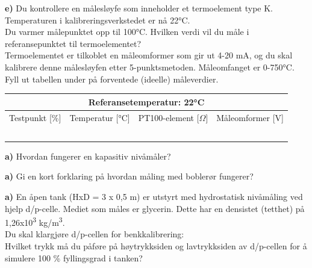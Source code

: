 \textbf{e)}
Du kontrollere en målesløyfe som inneholder et termoelement type K. Temperaturen i
kalibreringsverkstedet er nå 22°C.
\\
Du varmer målepunktet opp til 100°C. Hvilken verdi vil du måle i referansepunktet til termoelementet?
\\
Termoelementet er tilkoblet en måleomformer som gir ut 4-20 mA, og du skal kalibrere denne målesløyfen etter
5-punktsmetoden. Måleomfanget er 0-750°C. Fyll ut tabellen under på forventede (ideelle) måleverdier.

\begin{center}
	\begin{tabular}{| m{3.5cm} |m{3.5cm} |m{3.5cm} |m{3.5cm} |} 
\hline
	\multicolumn{4}{|c|}{\textbf{\cellcolor[HTML]{D5D5D5}Referansetemperatur: 22°C}} \\
\hline
\hline
\rowcolor [HTML]{D5D5D5}
		Testpunkt [\%] & Temperatur [°C]& PT100-element [$\Omega$]& Måleomformer [V]\\ 
\hline


\rule{0pt}{25pt}& & & \\   \hline
\rule{0pt}{25pt}& & & \\   \hline
\rule{0pt}{25pt}& & & \\   \hline
\rule{0pt}{25pt}& & & \\   \hline
\rule{0pt}{25pt}& & & \\   \hline
		
\end{tabular}
\end{center}

\oppgave{}%
\textbf{a)}
Hvordan fungerer en kapasitiv nivåmåler?
\vskip 1cm 
\vskip 1cm 
\textbf{a)}
Gi en kort forklaring på hvordan måling med boblerør fungerer?
\vskip 1cm 
\vskip 1cm 





\textbf{a)}
En åpen tank (HxD = 3 x 0,5 m) er utstyrt med hydrostatisk nivåmåling ved hjelp d/p-celle. Mediet som måles er glycerin. Dette har en densistet (tetthet) på 1,26x10\textsuperscript{3} kg/m\textsuperscript{3}.\\
Du skal klargjøre d/p-cellen for benkkalibrering:\\
Hvilket trykk må du påføre på høytrykksiden og lavtrykksiden av d/p-cellen for å simulere 100 \% fyllingsgrad i tanken?
\vskip 1cm 
\vskip 1cm 

